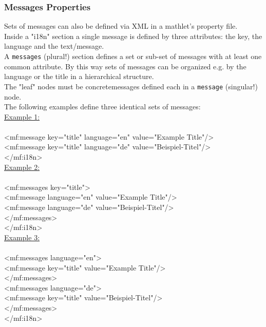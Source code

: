   \subsubsection{Messages Properties}
  Sets of messages can also be defined via XML in a mathlet's property file.\\
  Inside a "i18n" section a single message is defined by three attributes: the key, the language and
  the text/message.\\
  A {\tt messages} (plural!) section defines a set or sub-set of messages with at least one common
  attribute. By this way sets of messages can be organized e.g. by the language or the title in a 
  hierarchical structure.\\
  The "leaf" nodes must be concretemessages defined each in a {\tt message} (singular!) node.\\
  The following examples define three identical sets of messages:\\
  \underline{Example 1:}\\
  {\small\ttfamily
    \\
    \indent\indent <mf:message key="title" language="en" value="Example Title"/>\\
    \indent\indent <mf:message key="title" language="de" value="Beispiel-Titel"/>\\
    \indent </mf:i18n>\\
  }
  \underline{Example 2:}\\
  {\small\ttfamily
    \\
    \indent\indent <mf:messages key="title">\\
    \indent\indent\indent <mf:message language="en" value="Example Title"/>\\
    \indent\indent\indent <mf:message language="de" value="Beispiel-Titel"/>\\
    \indent\indent </mf:messages>\\
    \indent </mf:i18n>\\
  }
  \underline{Example 3:}\\
  {\small\ttfamily
    \\
    \indent\indent <mf:messages language="en">\\
    \indent\indent\indent <mf:message key="title" value="Example Title"/>\\
    \indent\indent </mf:messages>\\
    \indent\indent <mf:messages language="de">\\
    \indent\indent\indent <mf:message key="title" value="Beispiel-Titel"/>\\
    \indent\indent </mf:messages>\\
    \indent </mf:i18n>
  }
  

